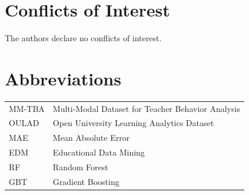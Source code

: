 \section*{Conflicts of Interest}
The authors declare no conflicts of interest.

\section*{Abbreviations}
\noindent
\begin{tabular}{@{}ll}
MM-TBA & Multi-Modal Dataset for Teacher Behavior Analysis \\
OULAD  & Open University Learning Analytics Dataset \\
MAE    & Mean Absolute Error \\
EDM    & Educational Data Mining \\
RF     & Random Forest \\
GBT    & Gradient Boosting \\
\end{tabular}

\nolinenumbers

